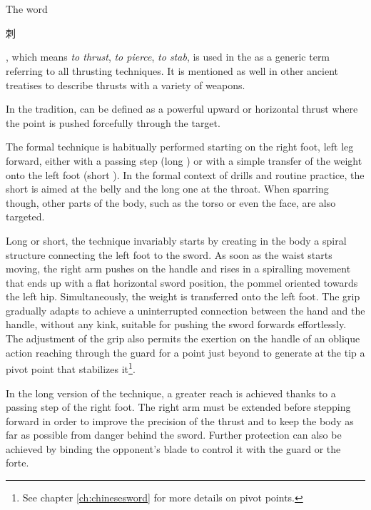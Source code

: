 \section{\Ci{}}
The word \Ci{} \begin{CJK*}{UTF8}{bsmi}刺\end{CJK*}, which means \textit{to thrust}, \textit{to pierce}, \textit{to stab}, is used in the \WubeiZhi{} as a generic term referring to all thrusting techniques. It is mentioned as well in other ancient treatises to describe thrusts with a variety of weapons.

In the \Yangjia{} \Michuan{} tradition, \Ci{} can be defined as a powerful upward or horizontal thrust where the point is pushed forcefully through the target. 

The formal technique is habitually performed starting on the right foot, left leg forward, either with a passing step (long \Ci{}) or with a simple transfer of the weight onto the left foot (short \Ci{}). In the formal context of drills and routine practice, the short \Ci{} is aimed at the belly and the long one at the throat. When sparring though, other parts of the body, such as the torso or even the face, are also targeted.

Long or short, the technique invariably starts by creating in the body a spiral structure connecting the left foot to the sword. As soon as the waist starts moving, the right arm pushes on the handle and rises in a spiralling movement that ends up with a flat horizontal sword position, the pommel oriented towards the left hip. Simultaneously, the weight is transferred onto the left foot. The grip gradually adapts to achieve a uninterrupted connection between the hand and the handle, without any kink, suitable for pushing the sword forwards effortlessly. The adjustment of the grip also permits the exertion on the handle of an oblique action reaching through the guard for a point just beyond to generate at the tip a pivot point that stabilizes it\footnote{See chapter \ref*{ch:chinesesword} for more details on pivot points.}. 

In the long version of the technique, a greater reach is achieved thanks to a passing step of the right foot. The right arm must be extended before stepping forward in order to improve the precision of the thrust and to keep the body as far as possible from danger behind the sword. Further protection can also be achieved by binding the opponent's blade to control it with the guard or the forte.

